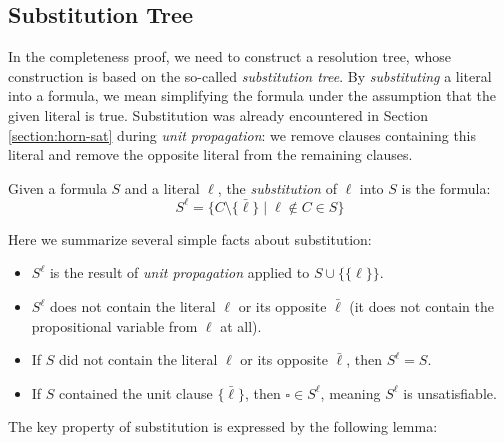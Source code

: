 \subsection{Substitution Tree}

In the completeness proof, we need to construct a resolution tree, whose construction is based on the so-called \emph{substitution tree}. By \emph{substituting} a literal into a formula, we mean simplifying the formula under the assumption that the given literal is true. Substitution was already encountered in Section \ref{section:horn-sat} during \emph{unit propagation}: we remove clauses containing this literal and remove the opposite literal from the remaining clauses.

\begin{definition}
    Given a formula $S$ and a literal $\ell$, the \emph{substitution} of $\ell$ into $S$ is the formula:
    $$
        S^\ell = \{C \setminus \{\bar{\ell}\} \mid \ell \notin C \in S\}
    $$    
\end{definition}

\begin{observation} Here we summarize several simple facts about substitution:
\begin{itemize}
    \item $S^\ell$ is the result of \emph{unit propagation} applied to $S \cup \{\{\ell\}\}$.
    \item $S^\ell$ does not contain the literal $\ell$ or its opposite $\bar{\ell}$ (it does not contain the propositional variable from $\ell$ at all).
    \item If $S$ did not contain the literal $\ell$ or its opposite $\bar{\ell}$, then $S^\ell = S$.
    \item If $S$ contained the unit clause $\{\bar{\ell}\}$, then $\square \in S^\ell$, meaning $S^\ell$ is unsatisfiable.
\end{itemize}    
\end{observation}

The key property of substitution is expressed by the following lemma:

